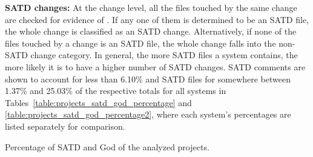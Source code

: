 \noindent\textbf{SATD changes:}
At the change level, all the files touched by the same change are checked for evidence of \SATD. If any one of them is determined to be an SATD file, the whole change is classified as an SATD change. Alternatively, if none of the files touched by a change is an SATD file, the whole change falls into the non-SATD change category. In general, the more SATD files a system contains, the more likely it is to have a higher number of SATD changes. SATD comments are shown to account for less than 6.10\% and SATD files for somewhere between 1.37\% and 25.03\% of the respective totals for all systems in Tables~\ref{table:projects_satd_god_percentage} and \ref{table:projects_satd_god_percentage2}, where each system's percentages are listed separately for comparison.

\begin{landscape}
	
	
	\begin{table}[htbp]
		\small
		\centering
		\caption{Percentage of SATD and God of the analyzed projects.}
		\begin{adjustbox}{width=1.0\textwidth}
			

\end{adjustbox}
\end{table}
\end{landscape}
